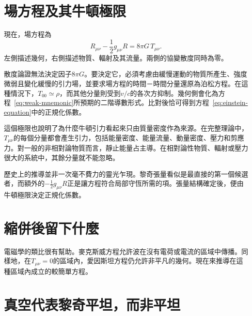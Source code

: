 \section{場方程及其牛頓極限}

現在，場方程為
\begin{equation}
 \boxed{
 R_{\mu\nu}-\frac12 g_{\mu\nu}R
 =
 8\pi G\,T_{\mu\nu}
 }.
 \label{eq:einstein-equation}
\end{equation}
左側描述幾何，右側描述物質、輻射及其流量。兩側的協變散度同時為零。

散度論證無法決定因子\(8\pi G\)。要決定它，必須考慮由緩慢運動的物質所產生、強度微弱且變化緩慢的引力場，並要求場方程的時間－時間分量還原為泊松方程。在這種情況下，\(T_{00}\simeq\rho\)，而其他分量則受到\(v/c\)的各次方抑制。幾何側會化為方程~\eqref{eq:weak-mnemonic}所預期的二階導數形式。比對後恰可得到方程~\eqref{eq:einstein-equation}中的正規化係數。

這個極限也說明了為什麼牛頓引力看起來只由質量密度作為來源。在完整理論中，\(T_{\mu\nu}\)的每個分量都會產生引力，包括能量密度、能量流量、動量密度、壓力和剪應力。對一般的非相對論物質而言，靜止能量占主導。在相對論性物質、輻射或壓力很大的系統中，其餘分量就不能忽略。

歷史上的推導並非一次毫不費力的靈光乍現。黎奇張量看似是最直接的第一個候選者，而額外的\(-\tfrac12g_{\mu\nu}R\)正是讓方程符合局部守恆所需的項。張量結構確定後，便由牛頓極限決定正規化係數。

\section{縮併後留下什麼}

\begin{classroomqa}
\end{classroomqa}

電磁學的類比很有幫助。麥克斯威方程允許波在沒有電荷或電流的區域中傳播。同樣地，在\(T_{\mu\nu}=0\)的區域內，愛因斯坦方程仍允許非平凡的幾何。現在來推導在這種區域內成立的較簡單方程。

\section{真空代表黎奇平坦，而非平坦}

